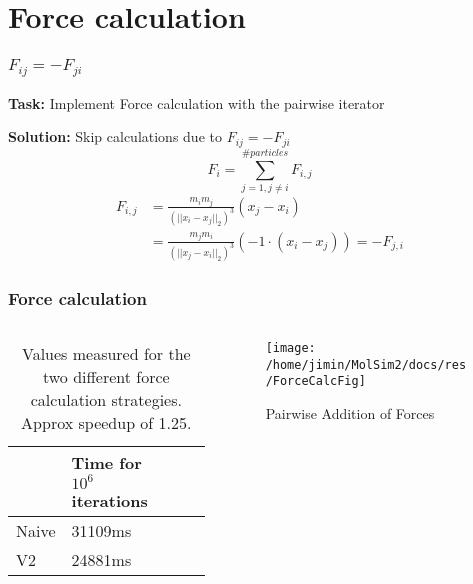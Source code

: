 \section{Force calculation}

\begin{frame}
    \frametitle{$F_{ij} = -F_{ji}$}
        \textbf{Task:} Implement Force calculation with the pairwise iterator

        \textbf{Solution:} Skip calculations due to $F_{ij} = -F_{ji}$
        \vspace{-15pt}
        \begin{equation}
            F_i = \sum_{j=1, j \neq i}^{\#particles} F_{i,j}
        \end{equation}
        \vspace{-15pt}
        \begin{align}
            F_{i,j} &= \frac{m_im_j}{(||x_i-x_j||_2)^3} (x_j - x_i) \\
                    &= \frac{m_jm_i}{(||x_j-x_i||_2)^3} \left(-1 \cdot \left(x_i - x_j\right)\right) = - F_{j,i}
        \end{align}
\end{frame}

\begin{frame}
    \frametitle{Force calculation}
    \begin{columns}
        \begin{column}{0.5\textwidth}
            \begin{table}[H]
                \begin{tabular}{|l|l|l|l|l|}
                \hline
                    & Time for $10^6$ iterations \\ \hline
                Naive & 31109ms                  \\ \hline
                V2    & 24881ms                  \\ \hline
                \end{tabular}
                \caption{Values measured for the two different force calculation strategies. Approx speedup of 1.25.}
                \label{tab:speedup}
            \end{table}
        \end{column}
        \begin{column}{0.5\textwidth}
            \begin{figure}[]
                \centering
                \texttt{[image: /home/jimin/MolSim2/docs/res/ForceCalcFig]}
                \caption{Pairwise Addition of Forces}
            \end{figure}
        \end{column}
    \end{columns}
\end{frame}
